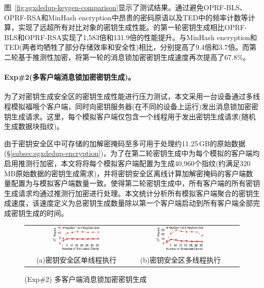 图~\ref{fig:sgxdedup-keygen-comparison}显示了测试结果。\sysnameS 通过避免OPRF-BLS、OPRF-RSA和MinHash encryption中昂贵的密码原语以及TED中的频率计数等计算，实现了远超所有对比对象的密钥生成性能。\sysnameS 的第一轮密钥生成相比OPRF-BLS和OPRF-RSA实现了1,583倍和131.9倍的性能提升。与MinHash encryption和TED(两者均牺牲了部分存储效率和安全性)相比，分别提高了9.4倍和3.7倍。而第二轮基于推测性加密，\sysnameS 将第一轮的消息锁加密密钥生成速度再次提高了67.8\%。

\paragraph*{Exp\#2(多客户端消息锁加密密钥生成)。}为了对密钥生成安全区的密钥生成性能进行压力测试，本文采用一台设备通过多线程模拟福哦个客户端，同时向密钥服务器(在不同的设备上运行)发出消息锁加密密钥生成请求。这里，每个模拟客户端仅包含一个线程用于发出密钥生成请求(随机生成数据块指纹)。

由于密钥安全区中可存储的加解密掩码至多可用于处理约11.25\,GB的原始数据(\S\ref{subsec:sgxdedup-encryption})，为了在第二轮密钥生成中为每个模拟的客户端均启用推测行加密，本文将将每个模拟客户端配置为生成40,960个指纹(约满足320\,MB原始数据的密钥生成需求)，并将密钥安全区离线计算加解密掩码的客户端数量配置为与模拟客户端数量一致。使得第二轮密钥生成中，所有客户端的所有密钥生成请求均通过推测行加密进行处理。本文统计分析所有模拟客户端聚合的密钥生成速度，该速度定义为总密钥生成数量除以第一个客户端启动到所有客户端全部完成密钥生成的时间。

\begin{figure}[!htb]
    \small
    \centering
    \begin{tabular}{@{}c@{}c@{}c}
        \includegraphics[width=0.49\textwidth]{pic/sgxdedup/expa3_keyScale_performance_number_singleThread.pdf} &
        \hspace{5pt}
        \includegraphics[width=0.49\textwidth]{pic/sgxdedup/expa3_keyScale_performance_number_multiThread.pdf}\\
        \mbox{\small (a)密钥安全区单线程执行} &
        \mbox{\small (b)密钥安全区多线程执行}\\
    \end{tabular}
    \caption{(Exp\#2) 多客户端消息锁加密密钥生成} 
    \label{fig:sgxdedup-exp-keygen-scalability}
\end{figure}

